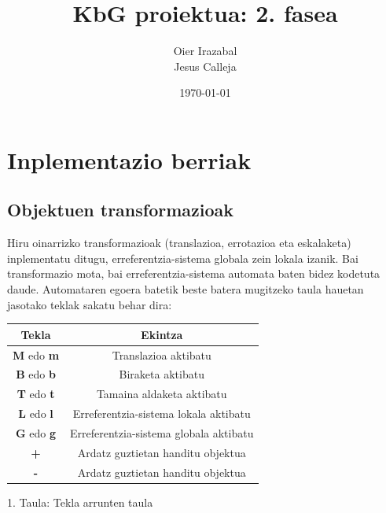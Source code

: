 \documentclass[12pt]{article}
\title{KbG proiektua: 2. fasea}
\author{
        Oier Irazabal\\
        Jesus Calleja
}
\date{\today}
\begin{document}
\maketitle


\tableofcontents

\pagebreak



\section{Inplementazio berriak}

\subsection{Objektuen transformazioak}\label{transformazioak}

Hiru oinarrizko transformazioak (translazioa, errotazioa eta eskalaketa) inplementatu ditugu, erreferentzia-sistema globala zein lokala izanik.
Bai transformazio mota, bai erreferentzia-sistema automata baten bidez kodetuta daude. Automataren egoera batetik beste batera mugitzeko taula hauetan jasotako teklak sakatu behar dira:\\

\begin{center}

\begin{tabular}{|c|c|}
																				\hline
	Tekla							& Ekintza									\\	\hline
	\textbf{M} edo \textbf{m}		& Translazioa aktibatu						\\	\hline
	\textbf{B} edo \textbf{b}		& Biraketa aktibatu							\\	\hline
	\textbf{T} edo \textbf{t}		& Tamaina aldaketa aktibatu					\\	\hline
	\textbf{L} edo \textbf{l}		& Erreferentzia-sistema lokala aktibatu	\\	\hline
	\textbf{G} edo \textbf{g}		& Erreferentzia-sistema globala aktibatu	\\	\hline
	\textbf{+}						& Ardatz guztietan handitu objektua		\\	\hline
	\textbf{-}						& Ardatz guztietan handitu objektua		\\	\hline
\end{tabular}

\vspace{0.3cm}
1. Taula: Tekla arrunten taula
\end{center}
\end{document}
